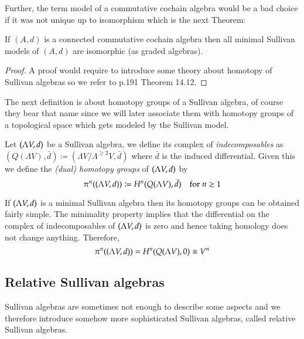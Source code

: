 Further, the term model of a commutative cochain algebra would be a bad choice if it was not unique up to isomorphism which 
is the next Theorem:

\begin{Theorem}
 \label{thm:UniquenessOfModels}
 If $(A,d)$ is a connected commutative cochain algebra then all minimal Sullivan models of $(A,d)$ are isomorphic
 (as graded algebras).
\end{Theorem}
\begin{proof}
 A proof would require to introduce some theory about homotopy of Sullivan algebras so we refer to \cite{Felix2001}
 p.191 Theorem 14.12.
\end{proof}


The next definition is about homotopy groups of a Sullivan algebra, of course they bear that name since we will later
associate them with homotopy groups of a topological space which gets modeled by the Sullivan model.

\begin{Definition}
 Let $(\Lambda V,d)$ be a Sullivan algebra, we define its complex of \emph{indecomposables} as
 $(Q(\Lambda V),\bar{d}) \coloneqq (\Lambda V / \Lambda^{\geq 2} V , \bar{d})$ where $\bar{d}$ is the induced differential.
 Given this we define the \emph{(dual) homotopy groups} of $(\Lambda V,d)$ by 
 $$ \pi^n ( (\Lambda V,d)) \coloneqq H^n(Q(\Lambda V),\bar{d}) \quad \text{for $n \geq 1$}$$
\end{Definition}

\begin{Remark}
 If $(\Lambda V,d)$ is a minimal Sullivan algebra then its homotopy groups can be obtained fairly simple. The minimality property
 implies that the differential on the complex of indecomposables of $(\Lambda V,d)$ is zero and hence taking
 homology does not change anything. Therefore, 
 $$ \pi^n ( (\Lambda V,d)) = H^n(Q(\Lambda V),0) \cong V^n$$
\end{Remark}

\subsection{Relative Sullivan algebras}

Sullivan algebras are sometimes not enough to describe some aspects and we therefore introduce somehow more sophisticated
Sullivan algebras, called relative Sullivan algebras.

